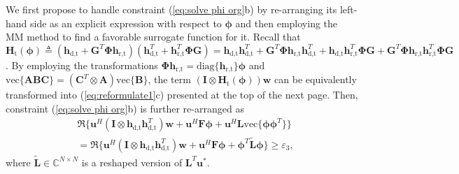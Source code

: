 \documentclass[Conference,a4paper]{IEEEtran}
\newcommand{\be}{\begin{equation}}
\newcommand{\ee}{\end{equation}}
\begin{document}
We first propose to handle constraint (\ref{eq:solve phi org}b) by re-arranging its left-hand side as an explicit expression with respect to $\bm{\phi}$ and then employing the MM method to find a favorable surrogate function for it.
Recall that $\mathbf{H}_\text{t}(\bm{\phi})\triangleq(\mathbf{h}_{\text{d},\text{t}} + \mathbf{G}^T\bm{\Phi}\mathbf{h}_{\text{r},\text{t}})(\mathbf{h}^T_{\text{d},\text{t}} + \mathbf{h}^T_{\text{r},\text{t}}\bm{\Phi}\mathbf{G}) = \mathbf{h}_{\text{d},\text{t}}\mathbf{h}^T_{\text{d},\text{t}} + \mathbf{G}^T\bm{\Phi}\mathbf{h}_{\text{r},\text{t}}\mathbf{h}^T_{\text{d},\text{t}} + \mathbf{h}_{\text{d},\text{t}}\mathbf{h}^T_{\text{r},\text{t}}\bm{\Phi}\mathbf{G} + \mathbf{G}^T\bm{\Phi}\mathbf{h}_{\text{r},\text{t}}\mathbf{h}^T_{\text{r},\text{t}}\bm{\Phi}\mathbf{G}$.
By employing the transformations $\bm{\Phi}\mathbf{h}_{\text{r},\text{t}} = \text{diag}\{\mathbf{h}_{\text{r},\text{t}}\}\bm{\phi}$ and $\text{vec}\{\mathbf{ABC}\}=(\mathbf{C}^T\otimes \mathbf{A})\text{vec}\{\mathbf{B}\}$, the term $(\mathbf{I}\otimes\mathbf{H}_\text{t}(\bm{\phi}))\mathbf{w}$ can be equivalently transformed into (\ref{eq:reformulate1}c) presented at the top of the next page.
Then, constraint (\ref{eq:solve phi org}b) is further re-arranged as
\be\label{eq:new radar constraint}\begin{aligned}
&\Re\big\{ \mathbf{u}^H(\mathbf{I}\otimes\mathbf{h}_{\text{d},\text{t}}\mathbf{h}_{\text{d},\text{t}}^T)\mathbf{w}
+ \mathbf{u}^H\mathbf{F}\bm{\phi} + \mathbf{u}^H\mathbf{L}\text{vec}\{\bm{\phi}\bm{\phi}^T\}\big\}\\
& = \Re\big\{ \mathbf{u}^H(\mathbf{I}\otimes\mathbf{h}_{\text{d},\text{t}}\mathbf{h}_{\text{d},\text{t}}^T)\mathbf{w}
+ \mathbf{u}^H\mathbf{F}\bm{\phi} + \bm{\phi}^T\widetilde{\mathbf{L}}\bm{\phi}\big\} \geq \varepsilon_3,
\end{aligned}\ee
where $\widetilde{\mathbf{L}}\in\mathbb{C}^{N\times N}$ is a reshaped version of $\mathbf{L}^T\mathbf{u}^*$.
\end{document}

